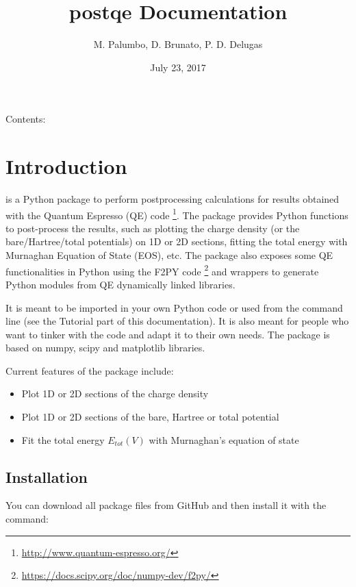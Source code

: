 \documentclass[letterpaper,10pt,english]{sphinxmanual}
\title{postqe Documentation}
\date{July 23, 2017}
\author{M. Palumbo, D. Brunato, P. D. Delugas}
\begin{document}
\maketitle
\tableofcontents
{}\label{index::doc}


Contents:


\chapter{Introduction}
\label{introduction:introduction}\label{introduction:id1}\label{introduction::doc}\label{introduction:welcome-to-postqe-s-documentation}
 is a Python package to perform postprocessing calculations for results obtained with the Quantum Espresso (QE) code \footnote[1]{
\href{http://www.quantum-espresso.org/}{http://www.quantum-espresso.org/}
}. The package provides Python functions to post-process the results, such as plotting the charge density (or the bare/Hartree/total potentials) on 1D or 2D sections, fitting the total energy with Murnaghan Equation of State (EOS), etc. The package also exposes some QE functionalities in Python using the F2PY code \footnote[2]{
\href{https://docs.scipy.org/doc/numpy-dev/f2py/}{https://docs.scipy.org/doc/numpy-dev/f2py/}
} and wrappers to generate Python modules from QE dynamically linked libraries.

It is meant to be imported in your own Python code or used from the command line (see the Tutorial part of this documentation). It is also meant for people who want to tinker with the code and adapt it to their own needs. The package is based on numpy, scipy and matplotlib libraries.

Current features of the package include:
\begin{itemize}
\item {} 
Plot 1D or 2D sections of the charge density

\item {} 
Plot 1D or 2D sections of the bare, Hartree or total potential

\item {} 
Fit the total energy \(E_{tot}(V)\) with Murnaghan's equation of state

\end{itemize}


\section{Installation}
\label{introduction:installation}
You can download all package files from GitHub  and then install it with the command:
\end{document}

